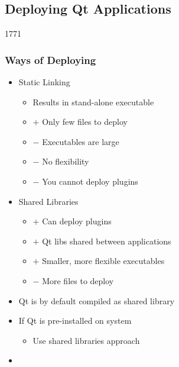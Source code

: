%
%
%
%

\subsection{Deploying Qt Applications}

\begin{slide}{1771}
  \frametitle{Ways of Deploying}
  \begin{itemize}
  \item Static Linking
    \begin{itemize}
    \item Results in stand-alone executable
    \item $+$ Only few files to deploy
    \item $-$ Executables are large
    \item $-$ No flexibility
    \item $-$ You cannot deploy plugins
    \end{itemize}
  \item Shared Libraries
    \begin{itemize}
    \item $+$ Can deploy plugins
    \item $+$ Qt libs shared between applications
    \item $+$ Smaller, more flexible executables
    \item $-$ More files to deploy
    \end{itemize}
  \item Qt is by default compiled as shared library
  \item If Qt is pre-installed on system
    \begin{itemize}
    \item Use shared libraries approach
    \end{itemize}
  \item {}
 \end{itemize}
\end{slide}

